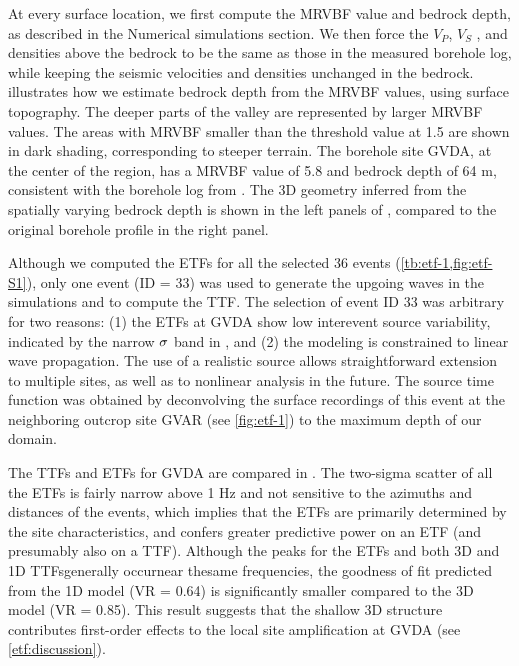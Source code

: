 {At every surface location, we first compute the MRVBF value and bedrock depth, as described in the Numerical simulations section. We then force the $V_P$, $V_S$ , and densities above the bedrock to be the same as those in the measured borehole log, while keeping the seismic velocities and densities unchanged in the bedrock.  illustrates how we estimate bedrock depth from the MRVBF values, using surface topography. The deeper parts of the valley are represented by larger MRVBF values. The areas with MRVBF smaller than the threshold value at 1.5 are shown in dark shading, corresponding to steeper terrain. The borehole site GVDA, at the center of the region, has a MRVBF value of 5.8 and bedrock depth of 64 m, consistent with the borehole log from \citet{gibbsNearsurfaceSwaveVelocities1989}. The 3D geometry inferred from the spatially varying bedrock depth is shown in the left panels of , compared to the original borehole profile in the right panel.

Although we computed the ETFs for all the selected 36 events (\cref{tb:etf-1,fig:etf-S1}), only one event (ID = 33) was used to generate the upgoing waves in the simulations and to compute the TTF. The selection of event ID 33 was arbitrary for two reasons: (1) the ETFs at GVDA show low interevent source variability, indicated by the narrow $\rm \sigma$ band in , and (2) the modeling is constrained to linear wave propagation. The use of a realistic source allows straightforward extension to multiple sites, as well as to nonlinear analysis in the future. The source time function was obtained by deconvolving the surface recordings of this event at the neighboring outcrop site GVAR (see \cref{fig:etf-1}) to the maximum depth of our domain.

The TTFs and ETFs for GVDA are compared in . The two-sigma scatter of all the ETFs is fairly narrow above 1 Hz and not sensitive to the azimuths and distances of the events, which implies that the ETFs are primarily determined by the site characteristics, and confers greater predictive power on an ETF (and presumably also on a TTF). Although the peaks for the ETFs and both 3D and 1D TTFsgenerally occurnear thesame frequencies, the goodness of fit predicted from the 1D model (VR = 0.64) is significantly smaller compared to the 3D model (VR = 0.85). This result suggests that the shallow 3D structure contributes first-order effects to the local site amplification at GVDA (see \cref{etf:discussion}).

}
